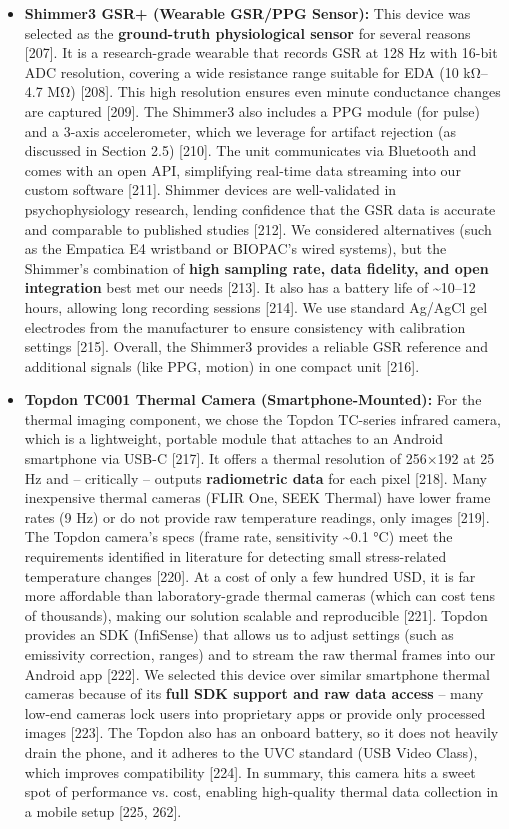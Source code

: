 \documentclass{article}
\begin{document}
    \begin{itemize}
        \item \textbf{Shimmer3 GSR+ (Wearable GSR/PPG Sensor):} This device was selected as the \textbf{ground-truth physiological sensor} for several reasons [207]. It is a research-grade wearable that records GSR at 128 Hz with 16-bit ADC resolution, covering a wide resistance range suitable for EDA (10 kΩ–4.7 MΩ) [208]. This high resolution ensures even minute conductance changes are captured [209]. The Shimmer3 also includes a PPG module (for pulse) and a 3-axis accelerometer, which we leverage for artifact rejection (as discussed in Section 2.5) [210]. The unit communicates via Bluetooth and comes with an open API, simplifying real-time data streaming into our custom software [211]. Shimmer devices are well-validated in psychophysiology research, lending confidence that the GSR data is accurate and comparable to published studies [212]. We considered alternatives (such as the Empatica E4 wristband or BIOPAC’s wired systems), but the Shimmer’s combination of \textbf{high sampling rate, data fidelity, and open integration} best met our needs [213]. It also has a battery life of \textasciitilde10–12 hours, allowing long recording sessions [214]. We use standard Ag/AgCl gel electrodes from the manufacturer to ensure consistency with calibration settings [215]. Overall, the Shimmer3 provides a reliable GSR reference and additional signals (like PPG, motion) in one compact unit [216].

        \item \textbf{Topdon TC001 Thermal Camera (Smartphone-Mounted):} For the thermal imaging component, we chose the Topdon TC-series infrared camera, which is a lightweight, portable module that attaches to an Android smartphone via USB-C [217]. It offers a thermal resolution of 256×192 at 25 Hz and – critically – outputs \textbf{radiometric data} for each pixel [218]. Many inexpensive thermal cameras (FLIR One, SEEK Thermal) have lower frame rates (9 Hz) or do not provide raw temperature readings, only images [219]. The Topdon camera’s specs (frame rate, sensitivity \textasciitilde0.1 °C) meet the requirements identified in literature for detecting small stress-related temperature changes [220]. At a cost of only a few hundred USD, it is far more affordable than laboratory-grade thermal cameras (which can cost tens of thousands), making our solution scalable and reproducible [221]. Topdon provides an SDK (InfiSense) that allows us to adjust settings (such as emissivity correction, ranges) and to stream the raw thermal frames into our Android app [222]. We selected this device over similar smartphone thermal cameras because of its \textbf{full SDK support and raw data access} – many low-end cameras lock users into proprietary apps or provide only processed images [223]. The Topdon also has an onboard battery, so it does not heavily drain the phone, and it adheres to the UVC standard (USB Video Class), which improves compatibility [224]. In summary, this camera hits a sweet spot of performance vs. cost, enabling high-quality thermal data collection in a mobile setup [225, 262].


\end{itemize}
\end{document}
